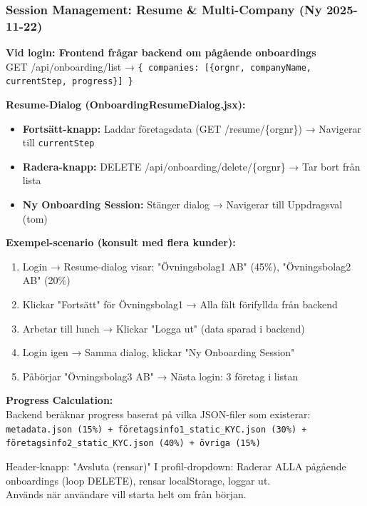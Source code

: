 \documentclass[10pt]{beamer}
\begin{document}
\begin{frame}[label=session-resume]
  \frametitle{Session Management: Resume \& Multi-Company (Ny 2025-11-22)}

  \footnotesize

  \textbf{Vid login: Frontend frågar backend om pågående onboardings}\\
  \tiny GET /api/onboarding/list → \texttt{\{ companies: [\{orgnr, companyName, currentStep, progress\}] \}}

  \vspace{0.3cm}

  \textbf{Resume-Dialog (OnboardingResumeDialog.jsx):}\\
  \begin{itemize}
    \tiny
    \item \textbf{Fortsätt-knapp:} Laddar företagsdata (GET /resume/\{orgnr\}) → Navigerar till \texttt{currentStep}
    \item \textbf{Radera-knapp:} DELETE /api/onboarding/delete/\{orgnr\} → Tar bort från lista
    \item \textbf{Ny Onboarding Session:} Stänger dialog → Navigerar till Uppdragsval (tom)
  \end{itemize}

  \vspace{0.3cm}

  \textbf{Exempel-scenario (konsult med flera kunder):}\\
  \begin{enumerate}
    \tiny
    \item Login → Resume-dialog visar: "Övningsbolag1 AB" (45\%), "Övningsbolag2 AB" (20\%)
    \item Klickar "Fortsätt" för Övningsbolag1 → Alla fält förifyllda från backend
    \item Arbetar till lunch → Klickar "Logga ut" (data sparad i backend)
    \item Login igen → Samma dialog, klickar "Ny Onboarding Session"
    \item Påbörjar "Övningsbolag3 AB" → Nästa login: 3 företag i listan
  \end{enumerate}

  \vspace{0.3cm}

  \textbf{Progress Calculation:}\\
  \tiny Backend beräknar progress baserat på vilka JSON-filer som existerar:\\
  \texttt{metadata.json (15\%) + företagsinfo1\_static\_KYC.json (30\%) + företagsinfo2\_static\_KYC.json (40\%) + övriga (15\%)}

  \vspace{0.3cm}

  \begin{alertblock}{Header-knapp: "Avsluta (rensar)"}
    \tiny I profil-dropdown: Raderar ALLA pågående onboardings (loop DELETE), rensar localStorage, loggar ut.\\
    Används när användare vill starta helt om från början.
  \end{alertblock}
\end{frame}
\end{document}
